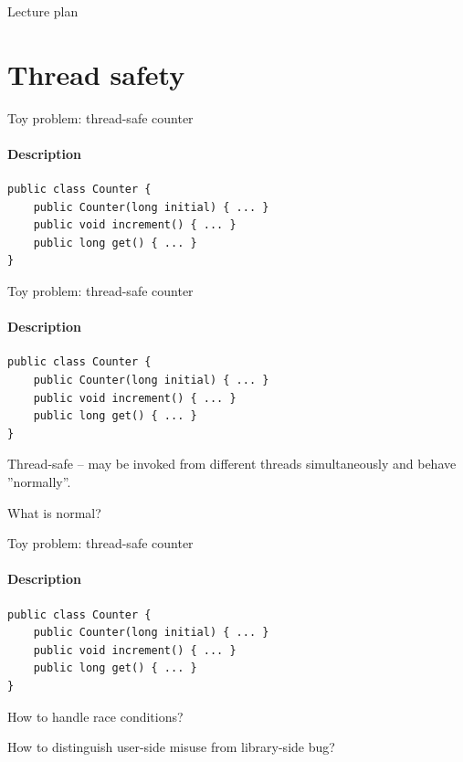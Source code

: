 \begin{frame}{Lecture plan}
\tableofcontents
\end{frame}


\section{Thread safety}
\showTOC

\begin{frame}[t,fragile]{Toy problem: thread-safe counter}
\framesubtitle{Description}

\begin{verbatim}
public class Counter {
    public Counter(long initial) { ... }
    public void increment() { ... }
    public long get() { ... }
}
\end{verbatim}
\end{frame}


\begin{frame}{Toy problem: thread-safe counter}
\framesubtitle{Description}

\begin{verbatim}
public class Counter {
    public Counter(long initial) { ... }
    public void increment() { ... }
    public long get() { ... }
}
\end{verbatim}

Thread-safe -- may be invoked from different threads simultaneously and behave ''normally''.

\pause
What is normal?

\pause
\begin{itemize}
    \item \texttt{get} and \texttt{increment}} are consistent 
    \item no \texttt{increment} is lost
\end{itemize}
\end{frame}


\begin{frame}[t,fragile]{Toy problem: thread-safe counter}
\framesubtitle{Description}

\begin{verbatim}
public class Counter {
    public Counter(long initial) { ... }
    public void increment() { ... }
    public long get() { ... }
}
\end{verbatim}

How to handle race conditions?

\pause

How to distinguish user-side misuse from library-side bug?

\end{frame}

